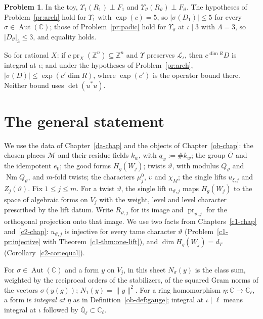 \documentclass[reqno]{amsart}
\newcounter{chap}
\theoremstyle{definition}
\newtheorem{problem}{Problem}[section]
\theoremstyle{plain}
\theoremstyle{remark}
\newcommand{\Z}{{\mathbb{Z}}}
\newcommand{\Q}{{\mathbb{Q}}}
\newcommand{\C}{{\mathbb{C}}}
\newcommand{\Lc}{{\mathcal{L}}}
\newcommand{\Mch}{{\mathcal{M}}}
\newcommand{\pr}{\operatorname{pr}}
\newcommand{\Aut}{\operatorname{Aut}}
\newcommand{\Nm}{\operatorname{Nm}}
\begin{document}
\begin{problem}\label{pr:toy-delta}
In the toy, \(\Upsilon_1(R_1) \perp F_1\) and \(\Upsilon_\vartheta(R_\vartheta) \perp F_\vartheta\).  The hypotheses of Problem~\ref{pr:arch} hold for \(\Upsilon_1\) with \(\exp(c) = 5\), so \(\lvert\sigma(D_1)\rvert \le 5\) for every \(\sigma \in \Aut(\C)\); those of Problem~\ref{pr:padic} hold for \(\Upsilon_\vartheta\) at \(\iota \mid 3\) with \(\Lambda = 3\), so \(\lvert D_\vartheta\rvert_3 \le 3\), and equality holds.
\end{problem}

So for rational \(X\): if \(c\pr_X(\Z^n)\subseteq\Z^n\) and \(\Upsilon\) preserves \(\Lc_\iota\), then \(c^{\dim R}D\) is integral at \(\iota\); and under the hypotheses of Problem~\ref{pr:arch}, \(\lvert\sigma(D)\rvert\le\exp(c'\dim R)\), where \(\exp(c')\) is the operator bound there.  Neither bound uses \(\det(u^*u)\).

\section{The general statement}\label{sec:general}

We use the data of Chapter~\ref{da-chap} and the objects of Chapter~\ref{ob-chap}: the chosen places \(\Mch\) and their residue fields \(k_w\), with \(q_w := \#k_w\); the group \(\bar G\) and the idempotent \(e_0\); the good forms \(H_g(W_j)\); twists \(\vartheta\), with modulus \(Q_\vartheta\) and \(\Nm Q_\vartheta\), and \(m\)-fold twists; the characters \(\mu_j^0\), \(\upsilon\) and \(\chi_M\); the single lifts \(u_{\xi,j}\) and \(Z_j(\vartheta)\).  Fix \(1 \le j \le m\).  For a twist \(\vartheta\), the single lift \(u_{\vartheta,j}\) maps \(H_g(W_j)\) to the space of algebraic forms on \(V_j\) with the weight, level and level character prescribed by the lift datum.  Write \(R_{\vartheta,j}\) for its image and \(\pr_{\vartheta,j}\) for the orthogonal projection onto that image.  We use two facts from Chapters~\ref{c1-chap} and~\ref{c2-chap}: \(u_{\vartheta,j}\) is injective for every tame character \(\vartheta\) (Problem~\ref{c1-pr:injective} with Theorem~\ref{c1-thm:one-lift}), and \(\dim H_g(W_j) = d_T\) (Corollary~\ref{c2-cor:equal}).

For \(\sigma \in \Aut(\C)\) and a form \(y\) on \(V_j\), in this sheet \(N_\sigma(y)\) is the class sum, weighted by the reciprocal orders of the stabilizers, of the squared Gram norms of the vectors \(\sigma(y(g))\); \(N_1(y) = \lVert y\rVert^2\).  For a ring homomorphism \(\eta \colon \C \to \C_\ell\), a form is \emph{integral at} \(\eta\) as in Definition~\ref{ob-def:gauge}; integral at \(\iota \mid \ell\) means integral at \(\iota\) followed by \(\bar\Q_\ell \subset \C_\ell\).
\end{document}
